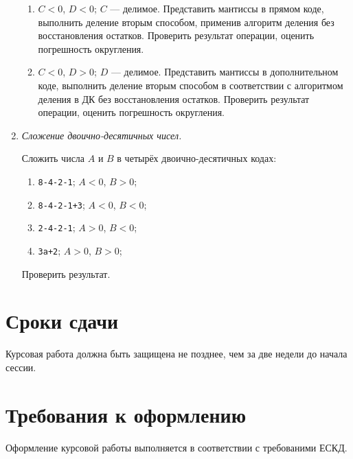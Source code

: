 \begin{enumerate}
\begin{enumerate}
        \item $C<0$, $D<0$; $C$ --- делимое. Представить мантиссы в прямом коде, выполнить деление вторым способом, применив алгоритм деления без восстановления остатков. Проверить результат операции, оценить погрешность округления.
        
        \item $C<0$, $D>0$; $D$ --- делимое. Представить мантиссы в дополнительном коде, выполнить деление вторым способом в соответствии с алгоритмом деления в ДК без восстановления остатков. Проверить результат операции, оценить погрешность округления.
    \end{enumerate}
    
    \item \emph{Сложение двоично-десятичных чисел.}
 	
    Сложить числа $A$ и $B$ в четырёх двоично-десятичных кодах: 
    \begin{enumerate}
        \item \texttt{8-4-2-1}; $A<0$, $B>0$;
        \item \texttt{8-4-2-1+3}; $A<0$, $B<0$;
        \item \texttt{2-4-2-1}; $A>0$, $B<0$;
        \item \texttt{3а+2}; $A>0$, $B>0$;
    \end{enumerate}
    Проверить результат. 	
\end{enumerate}


\section{Сроки сдачи}

Курсовая работа должна быть защищена не позднее, чем за две недели до начала сессии.

\section{Требования к оформлению}

Оформление курсовой работы выполняется в соответствии с требованими ЕСКД.
